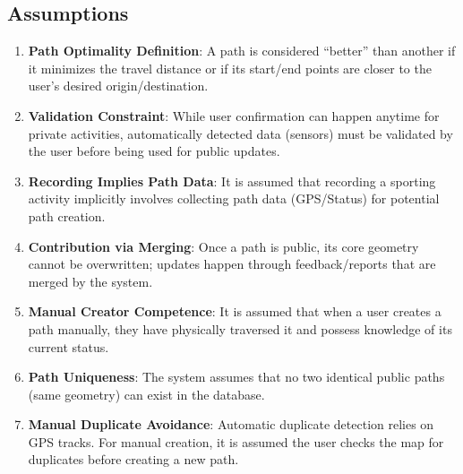 \subsection{Assumptions}
\begin{enumerate}[label={A\arabic*.}]
    \item \textbf{Path Optimality Definition}: A path is considered “better” than another if it minimizes the travel distance or if its start/end points are closer to the user's desired origin/destination.
    \item \textbf{Validation Constraint}: While user confirmation can happen anytime for private activities, automatically detected data (sensors) must be validated by the user before being used for public updates.
    \item \textbf{Recording Implies Path Data}: It is assumed that recording a sporting activity implicitly involves collecting path data (GPS/Status) for potential path creation.
    \item \textbf{Contribution via Merging}: Once a path is public, its core geometry cannot be overwritten; updates happen through feedback/reports that are merged by the system.
    \item \textbf{Manual Creator Competence}: It is assumed that when a user creates a path manually, they have physically traversed it and possess knowledge of its current status.
    \item \textbf{Path Uniqueness}: The system assumes that no two identical public paths (same geometry) can exist in the database.
    \item \textbf{Manual Duplicate Avoidance}: Automatic duplicate detection relies on GPS tracks. For manual creation, it is assumed the user checks the map for duplicates before creating a new path.
\end{enumerate}
